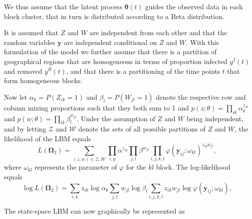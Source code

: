 \documentclass[10pt,a4paper]{article}
\begin{document}
We thus assume that the latent process $\boldsymbol{\theta}(t)$ guides the observed data in each block cluster, that in turn is distributed according to a Beta distribution. 

It is assumed that $Z$ and $W$ are independent from each other and that the random variables $\mathbf{y}$ are independent conditional on $Z$ and $W$. With this formulation of the model we further assume that there is a partition of geographical regions that are homogeneous in terms of proportion infected $y^I(t)$ and removed $y^R(t)$, and that there is a partitioning of the time points $t$ that form homogeneous blocks.

Now let $\alpha_k = P(Z_{ik} = 1)$ and $\beta_l = P(W_{jl} = 1)$ denote the respective row and column mixing proportions such that they both sum to 1 and 
%
$
p(z; \theta) = \prod_{ik} \alpha_k^{z_{ik}} 
$
%
and 
%
$
p(w; \theta) = \prod_{ik} \beta_l^{w_{jl}}. 
$ 
%
Under the assumption of $Z$ and $W$ being independent, and by letting $\mathcal{Z}$ and $\mathcal{W}$ denote the sets of all possible partitions of $Z$ and $W$, the likelihood of the LBM equals
$$
L(\boldsymbol{\Omega}_2) = \sum_{(z, w) \in \mathcal{Z}, \mathcal{W}} \prod_{i, g} \alpha^{z_{ig}} \prod_{j, l} \beta^{w_{jl}} \prod_{i, j, k, l} \varphi(\mathbf{y}_{ij}; \omega_{kl})^{z_{ig} w_{jl}},
$$
%
where $\omega_{kl}$ represents the parameter of $\varphi$ for the $kl$ block. The log-likelihood equals 
%
$$
\log L(\boldsymbol{\Omega}_2) = \sum_{i, k} z_{ik} \log\alpha_k \sum_{j, l} w_{jl} \log \beta_l \sum_{i, j, k, l} z_{ik} w_{jl} \log\varphi(\mathbf{y}_{ij}; \omega_{kl}),
$$
%

The state-space LBM can now graphically be represented as
\end{document}
